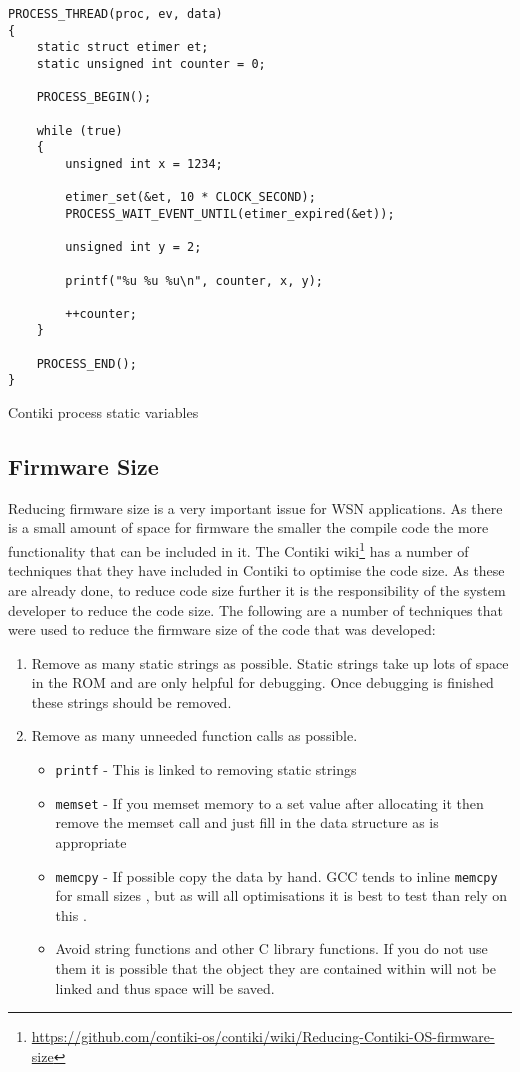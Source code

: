 \begin{listing}[H]
\begin{verbatim}
PROCESS_THREAD(proc, ev, data)
{
	static struct etimer et;
	static unsigned int counter = 0;

	PROCESS_BEGIN();

	while (true)
	{
		unsigned int x = 1234;

		etimer_set(&et, 10 * CLOCK_SECOND);
		PROCESS_WAIT_EVENT_UNTIL(etimer_expired(&et));

		unsigned int y = 2;

		printf("%u %u %u\n", counter, x, y);

		++counter;
	}

	PROCESS_END();
}
\end{verbatim}
\caption{Contiki process static variables}
\label{lst:contiki-process-static-variables}
\end{listing}

\subsection{Firmware Size}

Reducing firmware size is a very important issue for WSN applications. As there is a small amount of space for firmware \cite{?} the smaller the compile code the more functionality that can be included in it. The Contiki wiki\footnote{\url{https://github.com/contiki-os/contiki/wiki/Reducing-Contiki-OS-firmware-size}} has a number of techniques that they have included in Contiki to optimise the code size. As these are already done, to reduce code size further it is the responsibility of the system developer to reduce the code size. The following are a number of techniques that were used to reduce the firmware size of the code that was developed:

\begin{enumerate}
\item Remove as many static strings as possible. Static strings take up lots of space in the ROM and are only helpful for debugging. Once debugging is finished these strings should be removed.
\item Remove as many unneeded function calls as possible.
\begin{itemize}
\item \verb|printf| - This is linked to removing static strings
\item \verb|memset| - If you memset memory to a set value after allocating it then remove the memset call and just fill in the data structure as is appropriate
\item \verb|memcpy| - If possible copy the data by hand. GCC tends to inline \verb|memcpy| for small sizes \cite{?}, but as will all optimisations it is best to test than rely on this \cite{?}.
\item Avoid string functions and other C library functions. If you do not use them it is possible that the object they are contained within will not be linked and thus space will be saved. \cite{?}
\end{itemize}
\end{enumerate}

